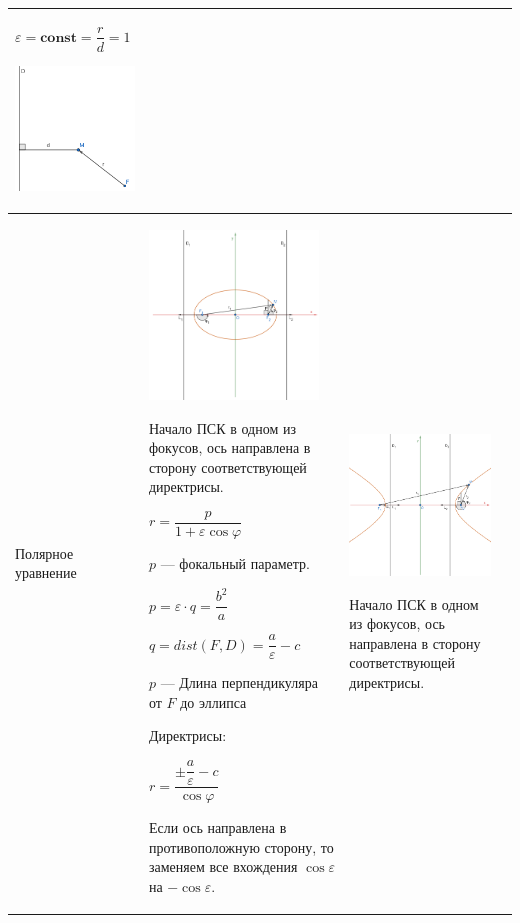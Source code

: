 \documentclass[twoside]{book}
\begin{document}
\begin{center}
\begin{longtable}{|p{2.5cm}|p{4.5cm}|p{4.5cm}|p{4.5cm}|}
        \(\varepsilon = \mathbf{const} = \dfrac{r}{d} = 1\)
        \begin{center}
            \includegraphics[width=4.5cm]{Images/Chapter_1/3-1-2.png}
        \end{center}
        \\
        \hline
        Полярное уравнение
         &
        \begin{center}
            \includegraphics[width=4.5cm]{Images/Chapter_1/3-1-10.png}
        \end{center}
        Начало ПСК в одном из фокусов, ось направлена в сторону соответствующей директрисы.

        \(r = \dfrac{p}{1 + \varepsilon \cos\varphi}\)

        \(p\) --- фокальный параметр.

        \(p = \varepsilon \cdot q = \dfrac{b^2}{a}\)

        \(q = dist(F, D) = \dfrac{a}{\varepsilon} - c\)

        \(p\) --- Длина перпендикуляра от \(F\) до эллипса

        Директрисы:

        \(r = \dfrac{\pm \dfrac{a}{\varepsilon} - c}{\cos\varphi}\)

        Если ось направлена в противоположную сторону, то заменяем все вхождения $\cos{\varepsilon}$ на $-\cos{\varepsilon}$.
         &
        \begin{center}
            \includegraphics[width=4.5cm]{Images/Chapter_1/3-1-11.png}
        \end{center}
        Начало ПСК в одном из фокусов, ось направлена в сторону соответствующей директрисы.


\end{longtable}
\end{center}
\end{document}
